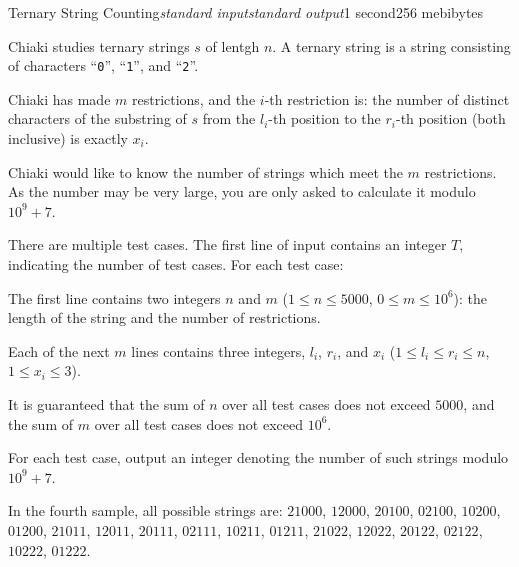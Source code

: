 \begin{problem}{Ternary String Counting}{\textsl{standard input}}{\textsl{standard output}}{1 second}{256 mebibytes}

Chiaki studies ternary strings $s$ of lentgh $n$.
A ternary string is a string consisting of characters ``\texttt{0}'', ``\texttt{1}'', and ``\texttt{2}''.

Chiaki has made $m$ restrictions, and the $i$-th restriction is: the number of distinct characters of the substring of $s$ from the $l_i$-th position to the $r_i$-th position (both inclusive) is exactly $x_i$.

Chiaki would like to know the number of strings which meet the $m$ restrictions.  As the number may be very large, you are only asked to calculate it modulo $10^9+7$.

\InputFile
There are multiple test cases. The first line of input contains an integer $T$, indicating the number of test cases. For each test case:

The first line contains two integers $n$ and $m$ ($1 \le n \le 5000$, $0 \le m \le 10^6$): the length of the string and the number of restrictions.

Each of the next $m$ lines contains three integers, $l_i$, $r_i$, and $x_i$ ($1 \le l_i \le r_i \le n$, $1 \le x_i \le 3$).


It is guaranteed that the sum of $n$ over all test cases does not exceed $5000$, and the sum of $m$ over all test cases does not exceed $10^6$.


\OutputFile
For each test case, output an integer denoting the number of such strings modulo $10^9+7$.




\Example

\begin{example}
%
\end{example}

\Note
In the fourth sample, all possible strings are: $21000$, $12000$, $20100$, $02100$, $10200$, $01200$, $21011$, $12011$, $20111$, $02111$, $10211$, $01211$, $21022$, $12022$, $20122$, $02122$, $10222$, $01222$.

\end{problem}
